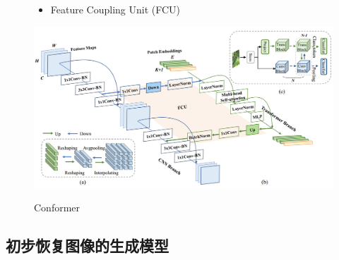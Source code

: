 \documentclass[CJK,aspectratio=169]{beamer}  %
\begin{document}
\begin{frame}
\begin{figure}
\begin{minipage}{.4\textwidth}
\begin{itemize}
					\item[\checkmark]
					Feature Coupling Unit (FCU)
				\end{itemize}
				\captionsetup{font=scriptsize}
				\label{fig: Contribution}
			\end{minipage}
			\begin{minipage}{.58\textwidth}
				\centering
				\includegraphics[width=\linewidth]{picture/LLIE/Conformer/the proposed Conformer}
				\captionsetup{font=scriptsize}
				\label{fig: Conformer}	
				\caption*{Conformer}
			\end{minipage}
			\captionsetup{font=scriptsize}
		\end{figure}
		
	\end{frame}
	
	\subsection{初步恢复图像的生成模型}
	
\end{document}
